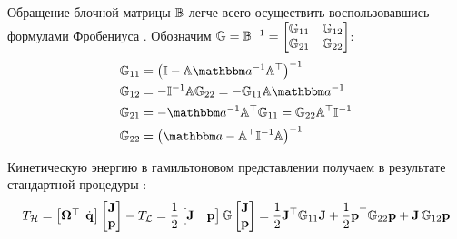 Обращение блочной матрицы $\mathbb{B}$ легче всего осуществить воспользовавшись формулами Фробениуса \cite{gantmaher}. Обозначим $\mathbb{G} = \mathbb{B}^{-1} = \begin{bmatrix} \mathbb{G}_{11} & \mathbb{G}_{12} \\ \mathbb{G}_{21} & \mathbb{G}_{22} \end{bmatrix}$:
\vverh
\begin{gather}
	\begin{aligned}
		\bbG_{11} &= \lb \bbI - \bbA \bba^{-1} \bbA^\top \rb^{-1} \\
		\bbG_{12} &= - \bbI^{-1} \bbA \bbG_{22} = - \bbG_{11} \bbA \bba^{-1} \\
		\bbG_{21} &= - \bba^{-1} \bbA^\top \bbG_{11} = \bbG_{22} \bbA^\top \bbI^{-1} \\
		\bbG_{22} &= \lb \bba - \bbA^\top \bbI^{-1} \bbA \rb^{-1}
	\end{aligned} \notag
\end{gather}

Кинетическую энергию в гамильтоновом представлении получаем в результате стандартной процедуры \cite{petrov2015}:
\vverh
\begin{gather}
	T_\mH = 
	\begin{bmatrix}
		\mf{\Omega}^\top & \hspace*{-2mm} \dot{\mf{q}}
	\end{bmatrix}
	\begin{bmatrix}
		\mf{J} \\
		\mf{p}
	\end{bmatrix}
	- T_\mL = \frac{1}{2} 
	\begin{bmatrix}
		\mf{J} & \mf{p}
	\end{bmatrix}
	\bbG
	\begin{bmatrix}
		\mf{J} \\
		\mf{p}
	\end{bmatrix} = 
	\frac{1}{2} \mf{J}^\top \bbG_{11} \mf{J} + \frac{1}{2} \mf{p}^\top \bbG_{22} \mf{p} + \mf{J} \, \bbG_{12} \mf{p} \notag
\end{gather}


